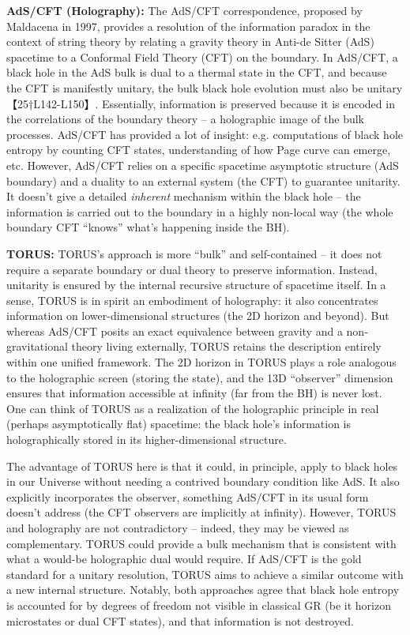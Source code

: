\documentclass[]{article}
\begin{document}
\textbf{AdS/CFT (Holography):} The AdS/CFT correspondence, proposed by
Maldacena in 1997, provides a resolution of the information paradox in
the context of string theory by relating a gravity theory in Anti-de
Sitter (AdS) spacetime to a Conformal Field Theory (CFT) on the
boundary. In AdS/CFT, a black hole in the AdS bulk is dual to a thermal
state in the CFT, and because the CFT is manifestly unitary, the bulk
black hole evolution must also be unitary【25†L142-L150】. Essentially,
information is preserved because it is encoded in the correlations of
the boundary theory -- a holographic image of the bulk processes.
AdS/CFT has provided a lot of insight: e.g. computations of black hole
entropy by counting CFT states, understanding of how Page curve can
emerge, etc. However, AdS/CFT relies on a specific spacetime asymptotic
structure (AdS boundary) and a duality to an external system (the CFT)
to guarantee unitarity. It doesn't give a detailed \emph{inherent}
mechanism within the black hole -- the information is carried out to the
boundary in a highly non-local way (the whole boundary CFT ``knows''
what's happening inside the BH).

\textbf{TORUS:} TORUS's approach is more ``bulk'' and self-contained --
it does not require a separate boundary or dual theory to preserve
information. Instead, unitarity is ensured by the internal recursive
structure of spacetime itself. In a sense, TORUS is in spirit an
embodiment of holography: it also concentrates information on
lower-dimensional structures (the 2D horizon and beyond). But whereas
AdS/CFT posits an exact equivalence between gravity and a
non-gravitational theory living externally, TORUS retains the
description entirely within one unified framework. The 2D horizon in
TORUS plays a role analogous to the holographic screen (storing the
state), and the 13D ``observer'' dimension ensures that information
accessible at infinity (far from the BH) is never lost. One can think of
TORUS as a realization of the holographic principle in real (perhaps
asymptotically flat) spacetime: the black hole's information is
holographically stored in its higher-dimensional structure.

The advantage of TORUS here is that it could, in principle, apply to
black holes in our Universe without needing a contrived boundary
condition like AdS. It also explicitly incorporates the observer,
something AdS/CFT in its usual form doesn't address (the CFT observers
are implicitly at infinity). However, TORUS and holography are not
contradictory -- indeed, they may be viewed as complementary. TORUS
could provide a bulk mechanism that is consistent with what a would-be
holographic dual would require. If AdS/CFT is the gold standard for a
unitary resolution, TORUS aims to achieve a similar outcome with a new
internal structure. Notably, both approaches agree that black hole
entropy is accounted for by degrees of freedom not visible in classical
GR (be it horizon microstates or dual CFT states), and that information
is not destroyed.
\end{document}
